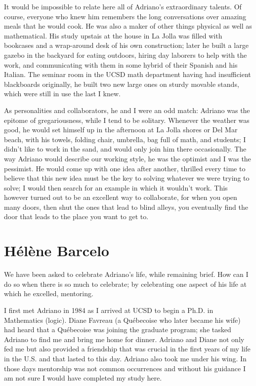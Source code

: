 \documentclass{notices}
\begin{document}
It would be impossible to relate here all of Adriano's extraordinary talents.  Of course, everyone who knew him remembers the long conversations over amazing meals that he would cook.  He was also a maker of other things physical as well as mathematical.  His study upstais at the house in La Jolla was filled with bookcases and a wrap-around desk of his own construction; later he built a large gazebo in the backyard for eating outdoors, hiring day laborers to help with the work, and communicating with them in some hybrid of their Spanish and his Italian.  The seminar room in the UCSD math department having had insufficient blackboards originally, he built two new large ones on sturdy movable stands, which were still in use the last I knew.

As personalities and collaborators, he and I were an odd match: Adriano was the epitome of gregariousness, while I tend to be solitary.  Whenever the weather was good, he would set himself up in the afternoon at La Jolla shores or Del Mar beach, with his towels, folding chair, umbrella, bag full of math, and students; I didn't like to work in the sand, and would only join him there occasionally.  The way Adriano would describe our working style, he was the optimist and I was the pessimist.  He would come up with one idea after another, thrilled every time to believe that this new idea must be the key to solving whatever we were trying to solve; I would then search for an example in which it wouldn't work.  This however turned out to be an excellent way to collaborate, for when you open many doors, then shut the ones that lead to blind alleys, you eventually find the door that leads to the place you want to get to.


\section*{H\'el\`ene Barcelo}

We have been asked to celebrate Adriano's life, while remaining brief. How can I do so when there is so much to celebrate; by celebrating one aspect of his life at which he excelled, mentoring.

I first met Adriano in 1984 as I arrived at UCSD to begin a Ph.D. in Mathematics (logic). Diane Favreau (a Qu\'ebecoise who later became his wife) had heard that a Qu\'ebecoise was joining the graduate program; she tasked Adriano to find me and bring me home for dinner. Adriano and Diane not only fed me but also provided a friendship that was crucial in the first years of my life in the U.S. and that lasted to this day. Adriano also took me under his wing. In those days mentorship was not common occurrences and without his guidance I am not sure I would have completed my study here.
\end{document}
